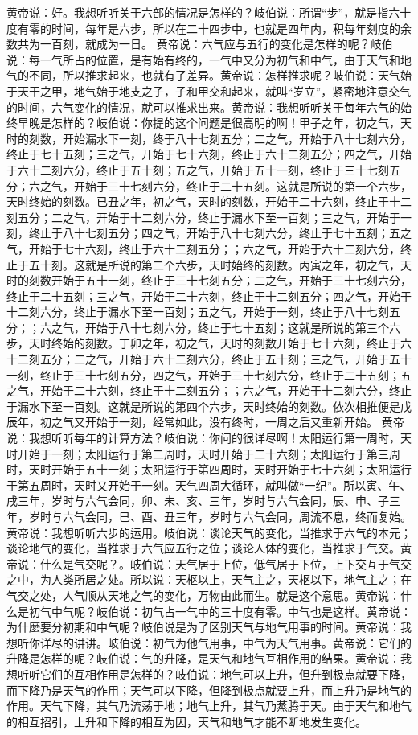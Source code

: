 \documentclass[a4paper,12pt,UTF8,twoside]{ctexbook}
\begin{document}
黄帝说：好。我想听听关于六部的情况是怎样的？岐伯说：所谓“步”，就是指六十度有零的时间，每年是六步，所以在二十四步中，也就是四年内，积每年刻度的余数共为一百刻，就成为一日。
黄帝说：六气应与五行的变化是怎样的呢？岐伯说：每一气所占的位置，是有始有终的，一气中又分为初气和中气，由于天气和地气的不同，所以推求起来，也就有了差异。黄帝说：怎样推求呢？岐伯说：天气始于天干之甲，地气始于地支之子，子和甲交和起来，就叫“岁立”，紧密地注意交气的时间，六气变化的情况，就可以推求出来。黄帝说：我想听听关于每年六气的始终早晚是怎样的？岐伯说：你提的这个问题是很高明的啊！甲子之年，初之气，天时的刻数，开始漏水下一刻，终于八十七刻五分；二之气，开始于八十七刻六分，终止于七十五刻；三之气，开始于七十六刻，终止于六十二刻五分；四之气，开始于六十二刻六分，终止于五十刻；五之气，开始于五十一刻，终止于三十七刻五分；六之气，开始于三十七刻六分，终止于二十五刻。这就是所说的第一个六步，天时终始的刻数。已丑之年，初之气，天时的刻数，开始于二十六刻，终止于十二刻五分；二之气，开始于十二刻六分，终止于漏水下至一百刻；三之气，开始于一刻，终止于八十七刻五分；四之气，开始于八十七刻六分，终止于七十五刻；五之气，开始于七十六刻，终止于六十二刻五分；；六之气，开始于六十二刻六分，终止于五十刻。这就是所说的第二个六步，天时始终的刻数。丙寅之年，初之气，天时的刻数开始于五十一刻，终止于三十七刻五分；二之气，开始于三十七刻六分，终止于二十五刻；三之气，开始于二十六刻，终止于十二刻五分；四之气，开始于十二刻六分，终止于漏水下至一百刻；五之气，开始于一刻，终止于八十七刻五分；；六之气，开始于八十七刻六分，终止于七十五刻；这就是所说的第三个六步，天时终始的刻数。丁卯之年，初之气，天时的刻数开始于七十六刻，终止于六十二刻五分；二之气，开始于六十二刻六分，终止于五十刻；三之气，开始于五十一刻，终止于三十七刻五分，四之气，开始于三十七刻六分，终止于二十五刻；五之气，开始于二十六刻，终止于十二刻五分；；六之气，开始于十二刻六分，终止于漏水下至一百刻。这就是所说的第四个六步，天时终始的刻数。依次相推便是戊辰年，初之气又开始于一刻，经常如此，没有终时，一周之后又重新开始。
黄帝说：我想听听每年的计算方法？岐伯说：你问的很详尽啊！太阳运行第一周时，天时开始于一刻；太阳运行于第二周时，天时开始于二十六刻；太阳运行于第三周时，天时开始于五十一刻；太阳运行于第四周时，天时开始于七十六刻；太阳运行于第五周时，天时又开始于一刻。天气四周大循环，就叫做“一纪”。所以寅、午、戌三年，岁时与六气会同，卯、未、亥、三年，岁时与六气会同，辰、申、子三年，岁时与六气会同，巳、酉、丑三年，岁时与六气会同，周流不息，终而复始。
黄帝说：我想听听六步的运用。岐伯说：谈论天气的变化，当推求于六气的本元；谈论地气的变化，当推求于六气应五行之位；谈论人体的变化，当推求于气交。黄帝说：什么是气交呢？。岐伯说：天气居于上位，低气居于下位，上下交互于气交之中，为人类所居之处。所以说：天枢以上，天气主之，天枢以下，地气主之；在气交之处，人气顺从天地之气的变化，万物由此而生。就是这个意思。黄帝说：什么是初气中气呢？岐伯说：初气占一气中的三十度有零。中气也是这样。黄帝说：为什麽要分初期和中气呢？岐伯说是为了区别天气与地气用事的时间。黄帝说：我想听你详尽的讲讲。岐伯说：初气为他气用事，中气为天气用事。黄帝说：它们的升降是怎样的呢？岐伯说：气的升降，是天气和地气互相作用的结果。黄帝说：我想听听它们的互相作用是怎样的？岐伯说：地气可以上升，但升到极点就要下降，而下降乃是天气的作用；天气可以下降，但降到极点就要上升，而上升乃是地气的作用。天气下降，其气乃流荡于地；地气上升，其气乃蒸腾于天。由于天气和地气的相互招引，上升和下降的相互为因，天气和地气才能不断地发生变化。
\end{document}
